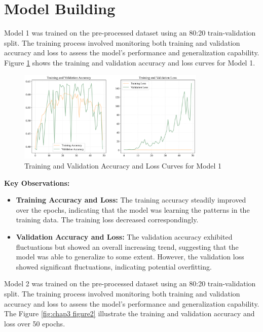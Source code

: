 \section{Model Building}
\label{sec:chap3 section 2}

Model 1 was trained on the pre-processed dataset using an 80:20 train-validation split. The training process involved monitoring both training and validation accuracy and loss to assess the model's performance and generalization capability. Figure \ref{fig:chap3 figure1} shows the training and validation accuracy and loss curves for Model 1.

\begin{figure}[H]
    \centering
    \includegraphics[width=0.8\textwidth]{figures/Figure29.png}
    \caption{Training and Validation Accuracy and Loss Curves for Model 1}
    \label{fig:chap3 figure1}
\end{figure}

\textbf{Key Observations:}
\begin{itemize}
    \item \textbf{Training Accuracy and Loss:} The training accuracy steadily improved over the epochs, indicating that the model was learning the patterns in the training data. The training loss decreased correspondingly.
    \item \textbf{Validation Accuracy and Loss:} The validation accuracy exhibited fluctuations but showed an overall increasing trend, suggesting that the model was able to generalize to some extent. However, the validation loss showed significant fluctuations, indicating potential overfitting.
\end{itemize}

Model 2 was trained on the pre-processed dataset using an 80:20 train-validation split. The training process involved monitoring both training and validation accuracy and loss to assess the model's performance and generalization capability. The Figure \ref{fig:chap3 figure2} illustrate the training and validation accuracy and loss over 50 epochs.

